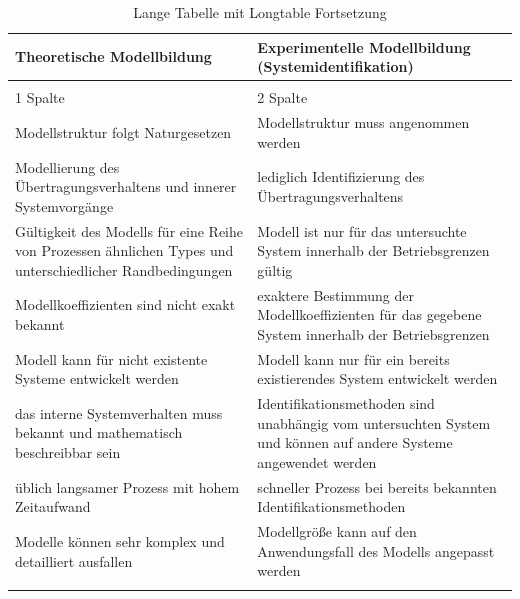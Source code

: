 \begin{longtable}{p{7.0cm} p{7.0cm}}
	\caption{Eigenschaften theoretischer und experimenteller Modellierungsansätze \cite{Isermann.2011}} \\ \toprule
	Theoretische Modellbildung & Experimentelle Modellbildung (Systemidentifikation) \\
	\hline
	\endfirsthead %
	\caption{Lange Tabelle mit Longtable Fortsetzung}\\
	1 Spalte & 2 Spalte\\
	\hline
	\endhead %
	\hline
	
	Modellstruktur folgt Naturgesetzen & Modellstruktur muss angenommen werden\\ \hline
	Modellierung des Übertragungsverhaltens und innerer Systemvorgänge & lediglich Identifizierung des Übertragungsverhaltens\\ \hline
	Gültigkeit des Modells für eine Reihe von Prozessen ähnlichen Types und unterschiedlicher Randbedingungen & Modell ist nur für das untersuchte System innerhalb der Betriebsgrenzen gültig\\ \hline
	Modellkoeffizienten sind nicht exakt bekannt & exaktere Bestimmung der Modellkoeffizienten für das gegebene System innerhalb der Betriebsgrenzen\\ \hline
	Modell kann für nicht existente Systeme entwickelt werden & Modell kann nur für ein bereits existierendes System entwickelt werden\\ \hline
	das interne Systemverhalten muss bekannt und mathematisch beschreibbar sein & Identifikationsmethoden sind unabhängig vom untersuchten System und können auf andere Systeme angewendet werden\\ \hline
	üblich langsamer Prozess mit hohem Zeitaufwand & schneller Prozess bei bereits bekannten Identifikationsmethoden\\ \hline
	Modelle können sehr komplex und detailliert ausfallen & Modellgröße kann auf den Anwendungsfall des Modells angepasst werden\\
	\bottomrule
	\label{tab:modeling_methods} 
\end{longtable}


